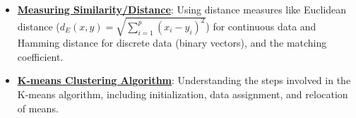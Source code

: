 \documentclass{article}%
\begin{document}
\begin{itemize}[leftmargin=*]
\item \href{https://purdue.brightspace.com/d2l/common/assets/pdfjs-d2l-dist/1.0.14-legacy/web/viewer.html?file=\%2Fcontent\%2Fenforced\%2F1095467-wl.202510.CS.24300.001\%2F12L2-distance-clusters.pdf\%3Fou\%3D1095467\&lang=en-us\&container=d2l-fileviewer-rendered-pdf\&fullscreen=d2l-fileviewer-rendered-pdf-dialog\&height=667#page=17}{\textbf{Measuring Similarity/Distance}}: Using distance measures like Euclidean distance ($d_E(x, y) = \sqrt{\sum_{i=1}^p (x_i - y_i)^2}$) for continuous data and Hamming distance for discrete data (binary vectors), and the matching coefficient.%
\item \href{https://purdue.brightspace.com/d2l/common/assets/pdfjs-d2l-dist/1.0.14-legacy/web/viewer.html?file=\%2Fcontent\%2Fenforced\%2F1095467-wl.202510.CS.24300.001\%2F12L2-distance-clusters.pdf\%3Fou\%3D1095467\&lang=en-us\&container=d2l-fileviewer-rendered-pdf\&fullscreen=d2l-fileviewer-rendered-pdf-dialog\&height=667#page=22}{\textbf{K{-}means Clustering Algorithm}}: Understanding the steps involved in the K-means algorithm, including initialization, data assignment, and relocation of means.%
\end{itemize}%
\end{document}
